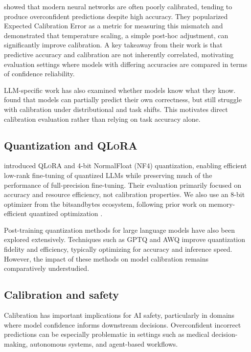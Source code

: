 \documentclass[10pt]{article}
\newcommand{\qlora}{\textsc{QLoRA}}
\begin{document}
\citet{guo2017calibration} showed that modern neural networks are often poorly calibrated, tending to produce overconfident predictions despite high accuracy. They popularized Expected Calibration Error as a metric for measuring this mismatch and demonstrated that temperature scaling, a simple post-hoc adjustment, can significantly improve calibration. A key takeaway from their work is that predictive accuracy and calibration are not inherently correlated, motivating evaluation settings where models with differing accuracies are compared in terms of confidence reliability.

LLM-specific work has also examined whether models know what they know. \citet{kadavath2022know} found that models can partially predict their own correctness, but still struggle with calibration under distributional and task shifts. This motivates direct calibration evaluation rather than relying on task accuracy alone.

\subsection{Quantization and \qlora}

\citet{dettmers2023qlora} introduced \qlora{} and 4-bit NormalFloat (NF4) quantization, enabling efficient low-rank fine-tuning of quantized LLMs while preserving much of the performance of full-precision fine-tuning. Their evaluation primarily focused on accuracy and resource efficiency, not calibration properties. We also use an 8-bit optimizer from the bitsandbytes ecosystem, following prior work on memory-efficient quantized optimization \citep{dettmers2022optimizers}.

Post-training quantization methods for large language models have also been explored extensively. Techniques such as GPTQ \citep{frantar2023gptq} and AWQ \citep{lin2024awq} improve quantization fidelity and efficiency, typically optimizing for accuracy and inference speed. However, the impact of these methods on model calibration remains comparatively understudied.

\subsection{Calibration and safety}

Calibration has important implications for AI safety, particularly in domains where model confidence informs downstream decisions. Overconfident incorrect predictions can be especially problematic in settings such as medical decision-making, autonomous systems, and agent-based workflows.
\end{document}
